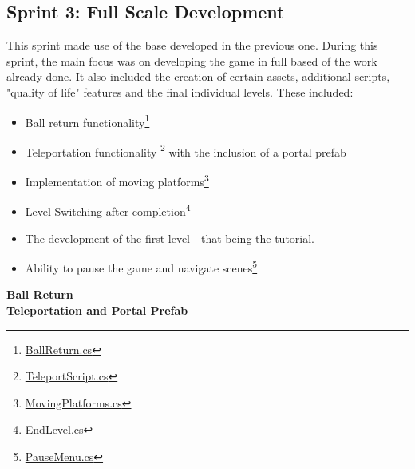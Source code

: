 \subsection{Sprint 3: Full Scale Development}
This sprint made use of the base developed in the previous one. During this sprint, the main focus was on developing the game in full based of the work already done. It also included the creation of certain assets, additional scripts, "quality of life" features and the final individual levels. These included:
\begin{itemize}
\item Ball return functionality\footnote{\href{https://github.com/Josh-SCG/Spherical_Shadows/blob/main/Assets/Scripts/BallReturn.cs}{BallReturn.cs}}

\item Teleportation functionality \footnote{\href{https://github.com/Josh-SCG/Spherical_Shadows/blob/main/Assets/Scripts/TeleportScript.cs}{TeleportScript.cs}} with the inclusion of a portal prefab

\item Implementation of moving platforms\footnote{\href{https://github.com/Josh-SCG/Spherical_Shadows/blob/main/Assets/Scripts/MovingPlatforms.cs}{MovingPlatforms.cs}}

\item Level Switching after completion\footnote{\href{https://github.com/Josh-SCG/Spherical_Shadows/blob/main/Assets/Scripts/EndLevel.cs}{EndLevel.cs}}

\item The development of the first level - that being the tutorial.

\item Ability to pause the game and navigate scenes\footnote{\href{https://github.com/Josh-SCG/Spherical_Shadows/blob/main/Assets/Scripts/PauseMenu.cs}{PauseMenu.cs}}
\end{itemize}

\textbf{Ball Return}\\


\textbf{Teleportation and Portal Prefab}\\


